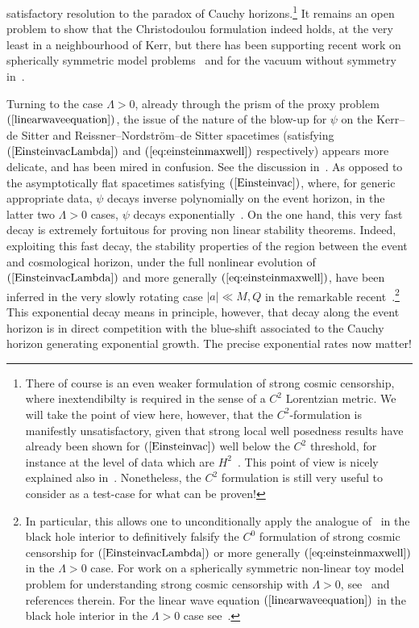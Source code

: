 \documentclass[A4,10pt]{article}
\begin{document}
satisfactory resolution to the paradox of 
Cauchy horizons.\footnote{There of course
is an even weaker formulation of strong cosmic censorship, where inextendibilty 
is required in the sense of a $C^2$ Lorentzian metric. We will take
the point of view here, however, that the $C^2$-formulation is manifestly 
unsatisfactory,
given that strong local well posedness results have already been 
shown for $(\ref{Einsteinvac})$ well below the $C^2$ threshold,
for instance at the level
of data which are $H^2$~\cite{Klainerman2015}. This point of view
is nicely explained also in~\cite{cardosoetal}.
Nonetheless, the $C^2$ formulation is still very useful to consider as a test-case for what
can be proven!}
It remains an open problem 
to show that the Christodoulou formulation indeed holds, at the very least in a neighbourhood of Kerr,
but there has been supporting recent work on spherically symmetric 
model 
problems~\cite{D2, LukOh2017one, LukOh2017two, VandeMoortel2018}
and for the vacuum without symmetry in~\cite{Lukweaknull}. 

Turning to the case $\Lambda>0$, already through the prism of the proxy problem $(\ref{linearwaveequation})$, the issue of the nature
of the blow-up for $\psi$ on the  Kerr--de Sitter and Reissner--Nordstr\"om--de Sitter 
spacetimes (satisfying $(\ref{EinsteinvacLambda})$ and $(\ref{eq:einsteinmaxwell})$ respectively) appears more delicate, and has been mired in confusion. See the discussion
in~\cite{Dafermos2014}. As opposed
to the asymptotically flat spacetimes satisfying $(\ref{Einsteinvac})$, 
where, for generic appropriate data,
$\psi$ decays inverse polynomially on 
the event horizon, in the latter two $\Lambda>0$ cases, $\psi$ decays exponentially~\cite{Haefner, 
Dafermos:2007jd, vasy}. 
On the one hand, this very fast decay is extremely fortuitous for proving non linear stability
theorems. Indeed,
exploiting this fast decay,
the stability properties of the region between the event and cosmological horizon,
under the full  nonlinear evolution of $(\ref{EinsteinvacLambda})$ and more generally 
$(\ref{eq:einsteinmaxwell})$,
have been inferred in the very slowly rotating case $|a|\ll M, Q$ in the remarkable 
recent~\cite{hintz2016global, hintz2016non}.\footnote{In particular, this allows
one to unconditionally apply the analogue of~\cite{DafLuk1} in the black hole interior
to definitively falsify the $C^0$ formulation of strong cosmic censorship for
$(\ref{EinsteinvacLambda})$ or more generally $(\ref{eq:einsteinmaxwell})$ in the
$\Lambda>0$ case. For work on a spherically symmetric non-linear toy model problem for
understanding strong cosmic censorship with $\Lambda>0$, see~\cite{Costa2017, possphsymmint}
and references therein. For the linear wave equation $(\ref{linearwaveequation})$ in the
black hole interior in the $\Lambda>0$ case see~\cite{hintzvasycosmoint}.}
This exponential decay means 
in principle, however, that decay along the event horizon is  in direct competition 
with the blue-shift associated to the Cauchy horizon generating exponential growth.
The precise exponential rates now matter!
\end{document}
